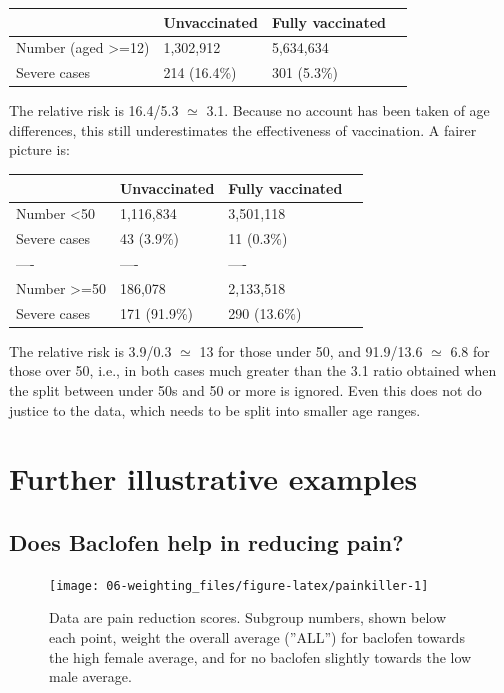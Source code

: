 \documentclass[
  10pt,
  b5paper]{book}
\begin{document}
\begin{longtable}[]{@{}llll@{}}
\toprule\noalign{}
& Unvaccinated & Fully vaccinated & \\
\midrule\noalign{}
\endhead
\bottomrule\noalign{}
\endlastfoot
Number (aged \textgreater=12) & 1,302,912 & 5,634,634 & \\
Severe cases & 214 (16.4\%) & 301 (5.3\%) & \\
\end{longtable}

The relative risk is 16.4/5.3 \(\simeq\) 3.1. Because no account has been taken of age differences, this still underestimates the effectiveness of vaccination. A fairer picture is:

\begin{longtable}[]{@{}llll@{}}
\toprule\noalign{}
& Unvaccinated & Fully vaccinated & \\
\midrule\noalign{}
\endhead
\bottomrule\noalign{}
\endlastfoot
Number \textless50 & 1,116,834 & 3,501,118 & \\
Severe cases & 43 (3.9\%) & 11 (0.3\%) & \\
---- & ---- & ---- & \\
Number \textgreater=50 & 186,078 & 2,133,518 & \\
Severe cases & 171 (91.9\%) & 290 (13.6\%) & \\
\end{longtable}

The relative risk is 3.9/0.3 \(\simeq\) 13 for those under 50, and 91.9/13.6 \(\simeq\) 6.8 for those over 50, i.e., in both cases much greater than the 3.1 ratio obtained when the split between under 50s and 50 or more is ignored. Even this does not do justice to the data, which needs to be split into smaller age ranges.

\hypertarget{further-illustrative-examples}{%
\section{Further illustrative examples}\label{further-illustrative-examples}}

\hypertarget{does-baclofen-help-in-reducing-pain}{%
\subsection*{Does Baclofen help in reducing pain?}\label{does-baclofen-help-in-reducing-pain}}

\begin{figure}[H]

{\centering \texttt{[image: 06-weighting\_files/figure-latex/painkiller-1]} 

}

\caption{Data are pain reduction scores. Subgroup numbers, shown
    below each point, weight the overall average (''ALL'') for
    baclofen towards the high female average, and for no baclofen
    slightly towards the low male average.}\label{fig:painkiller}
\end{figure}
\end{document}
